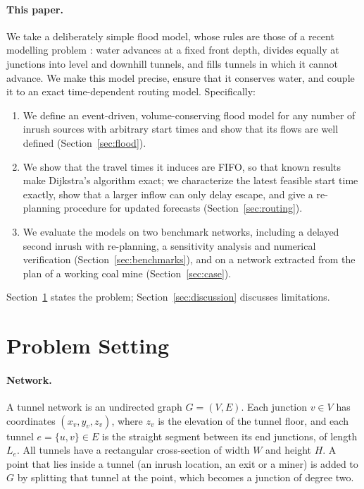 \documentclass[11pt,a4paper]{article}
\theoremstyle{plain}
\theoremstyle{definition}
\theoremstyle{remark}
\begin{document}
\paragraph{This paper.} We take a deliberately simple flood model, whose rules are those of a recent modelling problem \cite{cumcm}: water advances at a fixed front depth, divides equally at junctions into level and downhill tunnels, and fills tunnels in which it cannot advance. We make this model precise, ensure that it conserves water, and couple it to an exact time-dependent routing model. Specifically:
\begin{enumerate}[leftmargin=2em, itemsep=1pt, topsep=2pt]
  \item We define an event-driven, volume-conserving flood model for any number of inrush sources with arbitrary start times and show that its flows are well defined (Section~\ref{sec:flood}).
  \item We show that the travel times it induces are FIFO, so that known results make Dijkstra's algorithm exact; we characterize the latest feasible start time exactly, show that a larger inflow can only delay escape, and give a re-planning procedure for updated forecasts (Section~\ref{sec:routing}).
  \item We evaluate the models on two benchmark networks, including a delayed second inrush with re-planning, a sensitivity analysis and numerical verification (Section~\ref{sec:benchmarks}), and on a network extracted from the plan of a working coal mine (Section~\ref{sec:case}).
\end{enumerate}
Section~\ref{sec:setting} states the problem; Section~\ref{sec:discussion} discusses limitations.

\section{Problem Setting}\label{sec:setting}

\paragraph{Network.} A tunnel network is an undirected graph $G=(V,E)$. Each junction $v \in V$ has coordinates $(x_v, y_v, z_v)$, where $z_v$ is the elevation of the tunnel floor, and each tunnel $e = \{u,v\} \in E$ is the straight segment between its end junctions, of length $L_e$. All tunnels have a rectangular cross-section of width $W$ and height $H$. A point that lies inside a tunnel (an inrush location, an exit or a miner) is added to $G$ by splitting that tunnel at the point, which becomes a junction of degree two.
\end{document}
